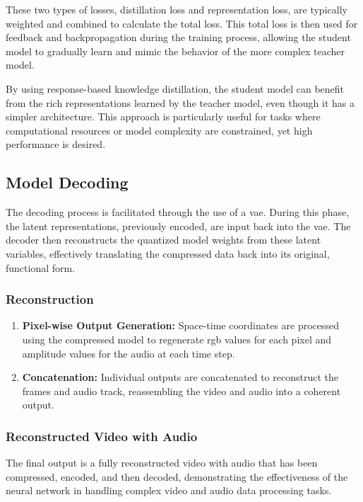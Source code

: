 \documentclass{ioereport}
\begin{document}
    These two types of losses, distillation loss and representation loss, are typically weighted and combined to calculate the total loss. This total loss is then used for feedback and backpropagation during the training process, allowing the student model to gradually learn and mimic the behavior of the more complex teacher model.
    
    By using response-based knowledge distillation, the student model can benefit from the rich representations learned by the teacher model, even though it has a simpler architecture. This approach is particularly useful for tasks where computational resources or model complexity are constrained, yet high performance is desired.

    \subsection{Model Decoding}
        The decoding process is facilitated through the use of a \gls{vae}. During this phase, the latent representations, previously encoded, are input back into the \gls{vae}. The decoder then reconstructs the quantized model weights from these latent variables, effectively translating the compressed data back into its original, functional form.
        \subsubsection{Reconstruction}
        \begin{enumerate}[label=\textbf{\roman*.}]
          \item \textbf{Pixel-wise Output Generation:} Space-time coordinates are processed using the compressed model to regenerate \gls{rgb} values for each pixel and amplitude values for the audio at each time step.
          \item \textbf{Concatenation:} Individual outputs are concatenated to reconstruct the frames and audio track, reassembling the video and audio into a coherent output.
        \end{enumerate}
        
        \subsubsection{Reconstructed Video with Audio}
        The final output is a fully reconstructed video with audio that has been compressed, encoded, and then decoded, demonstrating the effectiveness of the neural network in handling complex video and audio data processing tasks.
\end{document}

